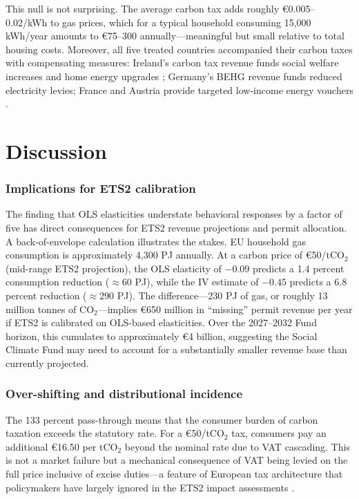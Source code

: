 \documentclass[12pt]{article}
\begin{document}
This null is not surprising. The average carbon tax adds roughly \euro{}0.005--0.02/kWh to gas prices, which for a typical household consuming 15,000 kWh/year amounts to \euro{}75--300 annually---meaningful but small relative to total housing costs. Moreover, all five treated countries accompanied their carbon taxes with compensating measures: Ireland's carbon tax revenue funds social welfare increases and home energy upgrades \citep{ireland_carbon_tax}; Germany's BEHG revenue funds reduced electricity levies; France and Austria provide targeted low-income energy vouchers \citep{flues2017oecd}.




\section{Discussion}
\label{sec:discussion}

\subsubsection*{Implications for ETS2 calibration} The finding that OLS elasticities understate behavioral responses by a factor of five has direct consequences for ETS2 revenue projections and permit allocation. A back-of-envelope calculation illustrates the stakes. EU household gas consumption is approximately 4,300 PJ annually. At a carbon price of \euro{}50/tCO$_2$ (mid-range ETS2 projection), the OLS elasticity of $-0.09$ predicts a 1.4 percent consumption reduction ($\approx$60 PJ), while the IV estimate of $-0.45$ predicts a 6.8 percent reduction ($\approx$290 PJ). The difference---230 PJ of gas, or roughly 13 million tonnes of CO$_2$---implies \euro{}650 million in ``missing'' permit revenue per year if ETS2 is calibrated on OLS-based elasticities. Over the 2027--2032 Fund horizon, this cumulates to approximately \euro{}4 billion, suggesting the Social Climate Fund may need to account for a substantially smaller revenue base than currently projected.

\subsubsection*{Over-shifting and distributional incidence} The 133 percent pass-through means that the consumer burden of carbon taxation exceeds the statutory rate. For a \euro{}50/tCO$_2$ tax, consumers pay an additional \euro{}16.50 per tCO$_2$ beyond the nominal rate due to VAT cascading. This is not a market failure but a mechanical consequence of VAT being levied on the full price inclusive of excise duties---a feature of European tax architecture that policymakers have largely ignored in the ETS2 impact assessments \citep{european_commission_2021_fit55}.
\end{document}
